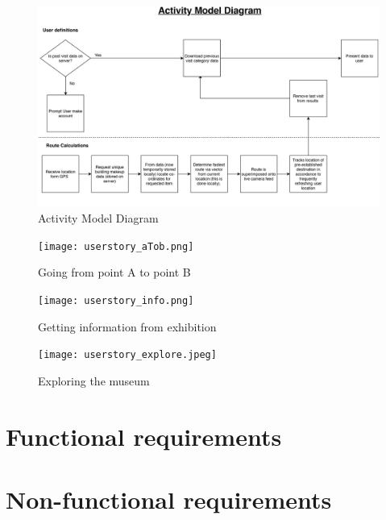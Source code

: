 \begin{figure}[H]
    \centering
    \includegraphics[angle=90, width=\textwidth]
    {assets/Activity_Diagram.pdf}
    \caption{Activity Model Diagram}
    \label{fig:Activity Model Diagram}
\end{figure}

\begin{figure}[H]
    \centering
    \texttt{[image: userstory\_aTob.png]}
    \caption{Going from point A to point B}
    \label{fig:AtoB}
\end{figure}

\begin{figure}[H]
    \texttt{[image: userstory\_info.png]}
    \caption{Getting information from exhibition}
    \label{fig:infofromexhibit}
\end{figure}

\begin{figure}[H]
    \texttt{[image: userstory\_explore.jpeg]}
    \caption{Exploring the museum}
    \label{fig:exploring}
\end{figure}

\section{Functional requirements}

\section{Non-functional requirements}